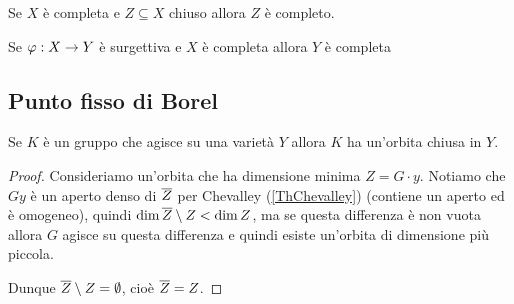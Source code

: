 \begin{remark}
Se $X$ \`e completa e $Z\subseteq X$ chiuso allora $Z$ \`e completo.
\end{remark}

\begin{remark}
Se $\varphi:X\to Y$ \`e surgettiva e $X$ \`e completa allora $Y$ \`e completa
\end{remark}

\subsection{Punto fisso di Borel}
\begin{proposition}\label{PrEsisteOrbitaChiusa}
Se $K$ \`e un gruppo che agisce su una variet\`a $Y$ allora $K$ ha un'orbita chiusa in $Y$.
\end{proposition}
\begin{proof}
Consideriamo un'orbita che ha dimensione minima $Z=G\cdot y$. Notiamo che $Gy$ \`e un aperto denso di $\overline{Z}$ per Chevalley (\ref{ThChevalley}) (contiene un aperto ed \`e omogeneo), quindi $\dim \overline{Z}\setminus Z<\dim Z$, ma se questa differenza \`e non vuota allora $G$ agisce su questa differenza e quindi esiste un'orbita di dimensione pi\`u piccola.

Dunque $\overline{Z}\setminus Z=\emptyset$, cio\`e $\overline{Z}=Z$.
\end{proof}

